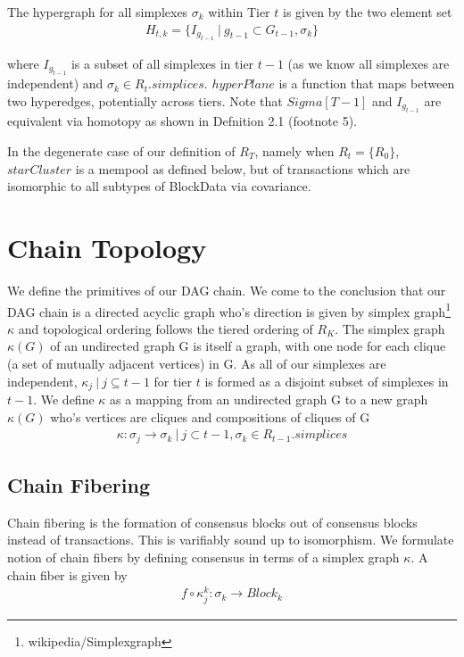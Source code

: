 \documentclass{article}
\begin{document}
The hypergraph for all simplexes $\sigma_k$ within Tier $t$ is given by the two element set
\begin{equation} \label{eq1}
\begin{split}
H_{t,k} = \{I_{g_{t-1}} \ | \ g_{t-1} \subset G_{t-1}, \sigma_k \}
\end{split}
\end{equation}

where $I_{g_{t-1}}$ is a subset of all simplexes in tier $t-1$ (as we know all simplexes are independent) and $\sigma_k \in R_t.simplices$. $hyperPlane$ is a function that maps between two hyperedges, potentially across tiers. Note that $Sigma[T-1]$ and $I_{g_{t-1}}$ are equivalent via homotopy as shown in Defnition 2.1 (footnote 5). 

In the degenerate case of our definition of $R_T$, namely when $R_t = \{R_0\}$, $starCluster$ is a mempool as defined below, but of transactions which are isomorphic to all subtypes of BlockData via covariance.

\section{Chain Topology}
We define the primitives of our DAG chain. We come to the conclusion that our DAG chain is a directed acyclic graph who's direction is given by simplex graph\footnote{wikipedia/Simplexgraph} $\kappa$ and topological ordering follows the tiered ordering of $R_K$. The simplex graph $\kappa(G)$ of an undirected graph G is itself a graph, with one node for each clique (a set of mutually adjacent vertices) in G. As all of our simplexes are independent, $\kappa_j \ | \ j \subseteq t-1$ for tier $t$ is formed as a disjoint subset of simplexes in $t-1$. We define $\kappa$ as a mapping from an undirected graph G to a new graph $\kappa(G)$ who's vertices are cliques and compositions of cliques of G
\begin{equation} \label{eq1}
\begin{split}
\kappa: \sigma_j \rightarrow \sigma_k \ | \ j \subset t-1, \sigma_k \in R_{t-1}.simplices
\end{split}
\end{equation}

\subsection{Chain Fibering}
Chain fibering is the formation of consensus blocks out of consensus blocks instead of transactions. This is varifiably sound up to isomorphism. We formulate notion of chain fibers by defining consensus in terms of a simplex graph $\kappa$. A chain fiber is given by 
\begin{equation} \label{eq1}
\begin{split}
f \circ \kappa_j^{k}: \sigma_k  \rightarrow Block_k
\end{split}
\end{equation}
\end{document}
